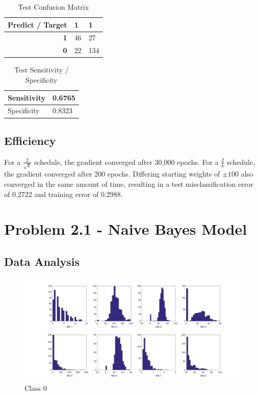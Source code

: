 \documentclass[12pt, letterpaper]{report}
\begin{document}
\begin{table}[H]
	\centering
	\begin{tabular}{ |r|l|l| }
		\hline
		\textbf{Predict / Target} & \textbf{1} & \textbf{1} \\
		\hline
		\textbf{1} & 46 & 27 \\
		\hline
		\textbf{0} & 22 & 134 \\
		\hline
	\end{tabular}
	\caption{Test Confusion Matrix}
\end{table}

\begin{table}[H]
	\centering
	\begin{tabular}{ |l|l| }
		\hline
		Sensitivity & 0.6765 \\
		\hline
		Specificity & 0.8323 \\
		\hline
	\end{tabular}
	\caption{Test Sensitivity / Specificity}
\end{table}

\subsection{Efficiency}

For a $\frac{2}{\sqrt{k}}$ schedule, the gradient converged after 30,000 epochs. For a $\frac{2}{k}$ schedule, the gradient converged after 200 epochs. Differing starting weights of $\pm100$ also converged in the same amount of time, resulting in a test misclassification error of 0.2722 and training error of 0.2988.

\section{Problem 2.1 - Naive Bayes Model}

\subsection{Data Analysis}

\begin{figure}[H]
	\centering
	\includegraphics[width=\columnwidth]{p2a0.png}
	\caption{Class 0}
\end{figure}
\end{document}
